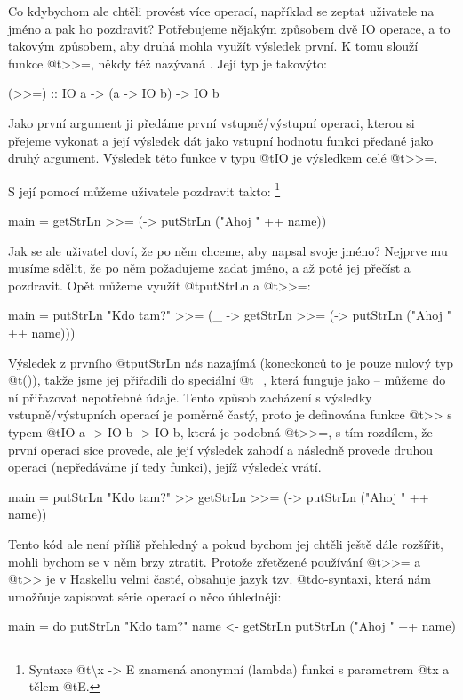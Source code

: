 Co kdybychom ale chtěli provést více operací, například se zeptat uživatele na
jméno a pak ho pozdravit? Potřebujeme nějakým způsobem  dvě IO
operace, a to takovým způsobem, aby druhá mohla využít výsledek první. K tomu
slouží funkce @t{>>=}, někdy též nazývaná . Její typ je takovýto:

\begin{haskell}
(>>=) :: IO a -> (a -> IO b) -> IO b
\end{haskell}

Jako první argument ji předáme první vstupně/výstupní operaci, kterou si přejeme
vykonat a její výsledek dát jako vstupní hodnotu funkci předané jako druhý
argument. Výsledek této funkce  v typu @t{IO} je výsledkem celé
@t{>>=}.

S její pomocí můžeme uživatele pozdravit takto: \footnote{Syntaxe
@t{\textbackslash x -> E} znamená anonymní (lambda) funkci s parametrem @t{x} a
tělem @t{E}.}

\begin{haskell}
main = getStrLn >>= (\name -> putStrLn ("Ahoj " ++ name))
\end{haskell}
  
Jak se ale uživatel doví, že po něm chceme, aby napsal svoje jméno? Nejprve mu
musíme sdělit, že po něm požadujeme zadat jméno, a až poté jej přečíst a
pozdravit. Opět můžeme využít @t{putStrLn} a @t{>>=}:

\begin{haskell}
main = 
  putStrLn "Kdo tam?" >>= (\_ ->
    getStrLn >>= (\name ->
      putStrLn ("Ahoj " ++ name)))
\end{haskell}

Výsledek z prvního @t{putStrLn} nás nazajímá (koneckonců to je pouze nulový typ
@t{()}), takže jsme jej přiřadili do speciální  @t{_}, která
funguje jako  -- můžeme do ní přiřazovat nepotřebné údaje. Tento
způsob zacházení s výsledky vstupně/výstupních operací je poměrně častý, proto
je definována funkce @t{>>} s typem @t{IO a -> IO b -> IO b}, která je podobná
@t{>>=}, s tím rozdílem, že první operaci sice provede, ale její výsledek zahodí
a následně provede druhou operaci (nepředáváme jí tedy funkci), jejíž výsledek
vrátí.

\begin{haskell}
main = 
  putStrLn "Kdo tam?" >>
    getStrLn >>= (\name ->
      putStrLn ("Ahoj " ++ name))
\end{haskell}

Tento kód ale není příliš přehledný a pokud bychom jej chtěli ještě dále
rozšířit, mohli bychom se v něm brzy ztratit. Protože zřetězené používání
@t{>>=} a @t{>>} je v Haskellu velmi časté, obsahuje jazyk tzv. @t{do}-syntaxi,
která nám umožňuje zapisovat série operací o něco úhledněji:

\begin{haskell}
main = do
  putStrLn "Kdo tam?"
  name <- getStrLn
  putStrLn ("Ahoj " ++ name)
\end{haskell}
